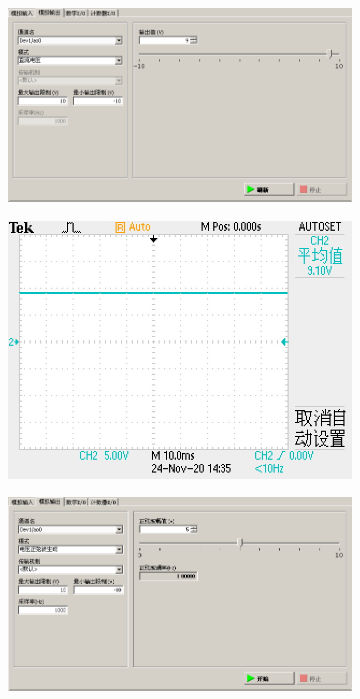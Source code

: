 \documentclass{ctexart}
\begin{document}
\begin{figure}[H]
  \centering
  \begin{subfigure}{0.54\linewidth}
    \includegraphics[width=\linewidth]{LabVIEW使用基础/信号测量系统测试/模拟输出/方波/虚拟仪器.PNG}
  \end{subfigure}
  \begin{subfigure}{0.41\linewidth}
    \includegraphics[width=\linewidth]{LabVIEW使用基础/信号测量系统测试/模拟输出/方波/示波器.JPG}
  \end{subfigure}
  \begin{subfigure}{0.54\linewidth}
    \includegraphics[width=\linewidth]{LabVIEW使用基础/信号测量系统测试/模拟输出/正弦波/虚拟仪器.PNG}

\end{subfigure}
\end{figure}
\end{document}
